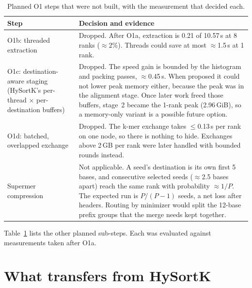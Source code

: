 \documentclass[sigconf,nonacm]{acmart}
\begin{document}
\begin{table}[t]
\caption{Planned O1 steps that were not built, with the measurement that
decided each.}
\label{tab:dropped}
\small
\begin{tabular}{@{}p{}p{}@{}}
\toprule
Step & Decision and evidence \\
\midrule
O1b: threaded extraction &
Dropped. After O1a, extraction is 0.21 of 10.57\,s at 8 ranks ($\approx$2\%).
Threads could save at most $\approx$1.5\,s at 1 rank. \\
O1c: destination-aware staging (HySortK's per-thread $\times$
per-destination buffers) &
Dropped. The speed gain is bounded by the histogram and packing passes,
$\approx$0.45\,s. When proposed it could not lower peak memory either, because
the peak was in the alignment stage. Once later work freed those buffers,
stage~2 became the 1-rank peak (2.96\,GiB), so a memory-only variant is a
possible future option. \\
O1d: batched, overlapped exchange &
Dropped. The k-mer exchange takes $\le$0.13\,s per rank on one node, so
there is nothing to hide. Exchanges above 2\,GB per rank were later handled
with bounded rounds instead. \\
Supermer compression &
Not applicable. A seed's destination is its own first 5 bases, and
consecutive selected seeds ($\approx$2.5 bases apart) reach the same rank
with probability $\approx 1/P$. The expected run is $P/(P{-}1)$ seeds, a net
loss after headers. Routing by minimizer would split the 12-base prefix
groups that the merge needs kept together. \\
\bottomrule
\end{tabular}
\end{table}

Table~\ref{tab:dropped} lists the other planned sub-steps. Each was evaluated
against measurements taken after O1a.

\section{What transfers from HySortK}
\end{document}
